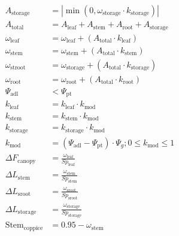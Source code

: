 \documentclass[10pt]{article}
\begin{document}
\begin{align}
A_{\text{storage}} &= |\min(0, \omega_{\text{storage}} \cdot k_{\text{storage}})|  \label{eqn:Astroot} \\
A_{\text{total}} &= A_{\text{leaf}} + A_{\text{stem}} + A_{\text{root}} + A_{\text{storage}}  \label{eqn:Atotal} \\
\omega_{\text{leaf}} &= \omega_{\text{leaf}} + (A_{\text{total}} \cdot k_{\text{leaf}}) \label{eqn:omegaleaf} \\
\omega_{\text{stem}} &= \omega_{\text{stem}} + (A_{\text{total}} \cdot k_{\text{stem}}) \label{eqn:omegastem} \\
 \omega_{\text{stroot}} &= \omega_{\text{storage}} + (A_{\text{total}} \cdot k_{\text{storage}})  \\
 \omega_{\text{root}} &= \omega_{\text{root}} + (A_{\text{total}} \cdot k_{\text{root}}) \label{eqn:omegaroot} \\
 \Psi_{\text{adl}} &< \Psi_{\text{pt}}  \\
 k_{\text{leaf}} &= k_{\text{leaf}} \cdot k_{\text{mod}} \\
 k_{\text{stem}} &= k_{\text{stem}} \cdot k_{\text{mod}} \\ 
 k_{\text{storage}} &= k_{\text{storage}} \cdot k_{\text{mod}}  \\ 
 k_{\text{mod}} &= (\Psi_{\text{adl}} - \Psi_{\text{pt}}) \cdot \Psi_g ; 0 \leq k_{\text{mod}} \leq 1 \label{eqn:kmod} \\
 \Delta F_{\text{canopy}} &= \frac{\omega_{\text{leaf}}}{Sp_{\text{leaf}}} \label{eqn:DeltaFcanopy} \\
 \Delta L_{\text{stem}} &= \frac{\omega_{\text{stem}}}{Sp_{\text{stem}}} \label{eqn:DeltaLstem} \\
 \Delta L_{\text{sroot}} &= \frac{\omega_{\text{sroot}}}{Sp_{\text{sroot}}} \label{eqn:DeltaLsroot} \\
 \Delta L_{\text{storage}} &= \frac{\omega_{\text{storage}}}{Sp_{\text{storage}}}\\
\text{Stem}_{\text{coppice}}&=0.95 - \omega_{\text{stem}}
\end{align}
\end{document}
